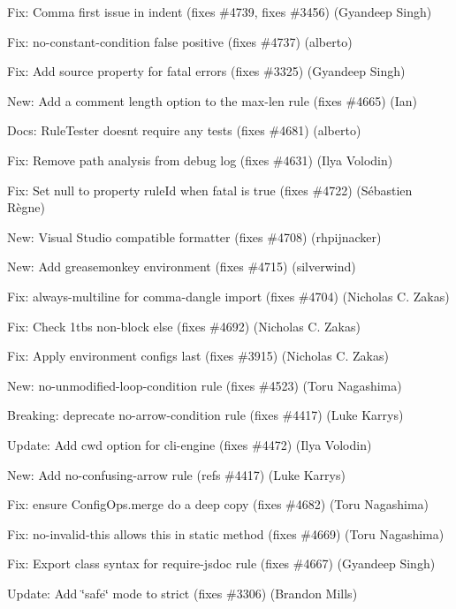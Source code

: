 \begin{DoxyItemize}
\item Fix\+: Comma first issue in {\ttfamily indent} (fixes \#4739, fixes \#3456) (Gyandeep Singh)
\item Fix\+: no-\/constant-\/condition false positive (fixes \#4737) (alberto)
\item Fix\+: Add source property for fatal errors (fixes \#3325) (Gyandeep Singh)
\item New\+: Add a comment length option to the max-\/len rule (fixes \#4665) (Ian)
\item Docs\+: Rule\+Tester doesn\textquotesingle{}t require any tests (fixes \#4681) (alberto)
\item Fix\+: Remove path analysis from debug log (fixes \#4631) (Ilya Volodin)
\item Fix\+: Set null to property rule\+Id when fatal is true (fixes \#4722) (Sébastien Règne)
\item New\+: Visual Studio compatible formatter (fixes \#4708) (rhpijnacker)
\item New\+: Add greasemonkey environment (fixes \#4715) (silverwind)
\item Fix\+: always-\/multiline for comma-\/dangle import (fixes \#4704) (Nicholas C. Zakas)
\item Fix\+: Check 1tbs non-\/block else (fixes \#4692) (Nicholas C. Zakas)
\item Fix\+: Apply environment configs last (fixes \#3915) (Nicholas C. Zakas)
\item New\+: {\ttfamily no-\/unmodified-\/loop-\/condition} rule (fixes \#4523) (Toru Nagashima)
\item Breaking\+: deprecate {\ttfamily no-\/arrow-\/condition} rule (fixes \#4417) (Luke Karrys)
\item Update\+: Add cwd option for cli-\/engine (fixes \#4472) (Ilya Volodin)
\item New\+: Add no-\/confusing-\/arrow rule (refs \#4417) (Luke Karrys)
\item Fix\+: ensure {\ttfamily Config\+Ops.\+merge} do a deep copy (fixes \#4682) (Toru Nagashima)
\item Fix\+: {\ttfamily no-\/invalid-\/this} allows this in static method (fixes \#4669) (Toru Nagashima)
\item Fix\+: Export class syntax for {\ttfamily require-\/jsdoc} rule (fixes \#4667) (Gyandeep Singh)
\item Update\+: Add \char`\"{}safe\char`\"{} mode to strict (fixes \#3306) (Brandon Mills)
\end{DoxyItemize}

